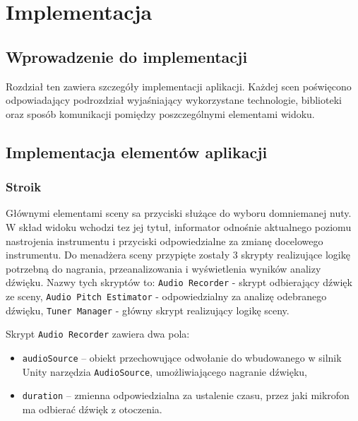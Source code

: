 \chapter{Implementacja}

\section{Wprowadzenie do implementacji}


Rozdział ten zawiera szczegóły implementacji aplikacji. Każdej scen poświęcono odpowiadający podrozdział wyjaśniający wykorzystane technologie, biblioteki oraz sposób komunikacji pomiędzy poszczególnymi elementami widoku. 




\section{Implementacja elementów aplikacji}

\subsection{Stroik}

Głównymi elementami sceny sa przyciski służące do wyboru domniemanej nuty. W skład widoku wchodzi tez jej tytuł, informator odnośnie aktualnego poziomu nastrojenia instrumentu i przyciski odpowiedzialne za zmianę docelowego instrumentu. Do menadżera sceny przypięte zostały 3 skrypty realizujące logikę potrzebną do nagrania, przeanalizowania i wyświetlenia wyników analizy dźwięku. Nazwy tych skryptów to: \texttt{Audio Recorder} - skrypt odbierający dźwięk ze sceny, \texttt{Audio Pitch Estimator} - odpowiedzialny za analizę odebranego dźwięku, \texttt{Tuner Manager} - główny skrypt realizujący logikę sceny. 

Skrypt \texttt{Audio Recorder} zawiera dwa pola:
\begin{itemize}
    \item \texttt{audioSource} -- obiekt przechowujące odwołanie do wbudowanego w silnik Unity narzędzia \texttt{AudioSource}, umożliwiającego nagranie dźwięku,
    \item \texttt{duration} -- zmienna odpowiedzialna za ustalenie czasu, przez jaki mikrofon ma odbierać dźwięk z otoczenia.
\end{itemize}

